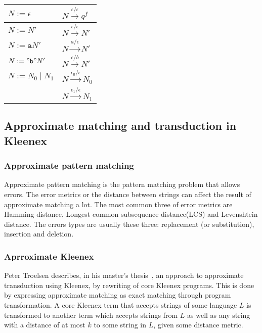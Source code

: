\begin{center}
  \begin{tabular}{|l|l|}
    \hline
    $N := \epsilon$       & $N \xrightarrow{\epsilon/\epsilon} q^f$   \\
    \hline
    $N := N'$             & $N \xrightarrow{\epsilon/\epsilon} N'$    \\
    \hline
    $N := \mathtt{a}N'$   & $N \xrightarrow{a/\epsilon} N'$           \\
    \hline
    $N := \mathtt{"b"}N'$ & $N \xrightarrow{\epsilon/b} N'$           \\
    \hline
    $N := N_0 \;|\; N_1$  & $N \xrightarrow{\epsilon_0/\epsilon} N_0$ \\
                          & $N \xrightarrow{\epsilon_1/\epsilon} N_1$ \\
    \hline
  \end{tabular}
\end{center}


\subsection{Approximate matching and transduction in Kleenex}
\subsubsection{Approximate pattern matching}
Approximate pattern matching is the pattern matching problem that allows errors. The error metrics or the distance between strings can affect the result of approximate matching a lot. The most common three of error metrics are Hamming distance, Longest common subsequence distance(LCS) and Levenshtein distance. The errors types are usually these three: replacement (or substitution), insertion and deletion.


\subsubsection{Aprroximate Kleenex} \label{sec:approx-kleenex}
Peter Troelsen describes, in his master's
thesis~\cite{troelsen2016approximate}, an approach to approximate transduction
using Kleenex, by rewriting of core Kleenex programs. This is done by
expressing approximate matching as exact matching through program
transformation. A core Kleenex term that accepts strings of some language $L$
is transformed to another term which accepts strings from $L$ as well as any
string with a distance of at most $k$ to some string in $L$, given some
distance metric.

